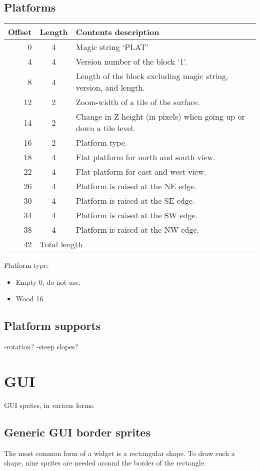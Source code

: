 \documentclass{article}
\begin{document}
\subsection{Platforms}
\begin{center}
\begin{tabular}{|r|c|l|} \hline
\textbf{Offset} & \textbf{Length} & \textbf{Contents description} \\ \hline
   0 &  4 & Magic string `PLAT' \\
   4 &  4 & Version number of the block `1'. \\
   8 &  4 & Length of the block excluding magic string, version, and length. \\
  12 &  2 & Zoom-width of a tile of the surface. \\
  14 &  2 & Change in Z height (in pixels) when going up or down a tile level. \\
  16 &  2 & Platform type. \\
  18 &  4 & Flat platform for north and south view. \\
  22 &  4 & Flat platform for east and west view. \\
  26 &  4 & Platform is raised at the NE edge. \\
  30 &  4 & Platform is raised at the SE edge. \\
  34 &  4 & Platform is raised at the SW edge. \\
  38 &  4 & Platform is raised at the NW edge. \\ \hline
  42 & \multicolumn{2}{l|}{Total length} \\ \hline
\end{tabular}
\end{center}

Platform type:
\begin{itemize}
\item Empty 0, do not use.
\item Wood 16.
\end{itemize}


\subsection{Platform supports}
-rotation?
-steep slopes?

\section{GUI}
GUI{} sprites, in various forms.

\subsection{Generic GUI{} border sprites}
The most common form of a widget is a rectangular shape.
To draw such a shape, nine sprites are needed around the border of the
rectangle.
\end{document}
